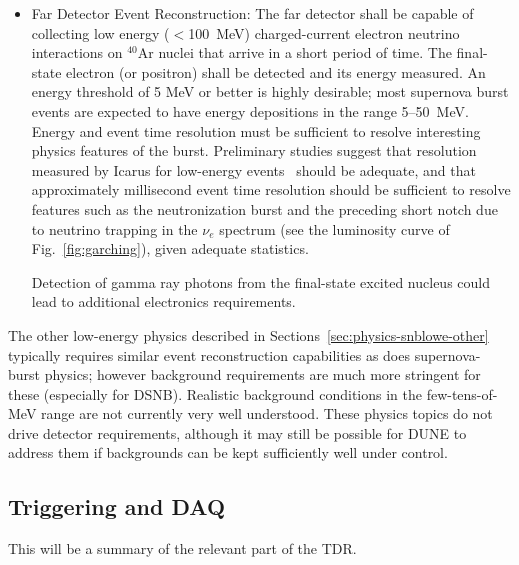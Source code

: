 \begin{itemize}
\item Far Detector Event Reconstruction:   
The far detector shall be capable of collecting low energy ($<$\SI{100}{\MeV})  charged-current electron neutrino interactions on $^{40}$Ar nuclei that arrive in a short period of time. The final-state electron (or positron) shall be detected and its energy measured.   An energy threshold of 5 MeV or better is highly desirable; most supernova burst events are expected to have energy depositions in the range 5--50~MeV.
Energy and event time resolution must be sufficient to resolve interesting physics features of the burst.  Preliminary studies suggest that resolution measured by Icarus for low-energy events~\cite{Amoruso:2003sw} should be adequate, and that approximately millisecond event time resolution should be sufficient to resolve features such as the neutronization burst and the preceding short notch due to neutrino trapping in the $\nu_e$ spectrum (see the luminosity curve of Fig.~\ref{fig:garching}), given adequate statistics.   

Detection of gamma ray photons from the final-state excited nucleus could lead to additional electronics requirements.  

\end{itemize}



The other low-energy physics described in Sections~\ref{sec:physics-snblowe-other} typically requires similar event reconstruction capabilities as does supernova-burst physics; however background requirements are much more stringent for these (especially for DSNB).  Realistic background conditions in the few-tens-of-MeV range are not currently  very well understood.  
These physics topics do not drive detector requirements, although it may still be possible for DUNE to address them if backgrounds can be kept sufficiently well under control.




\subsection{Triggering and DAQ}

This will be a summary of the relevant part of the TDR.


